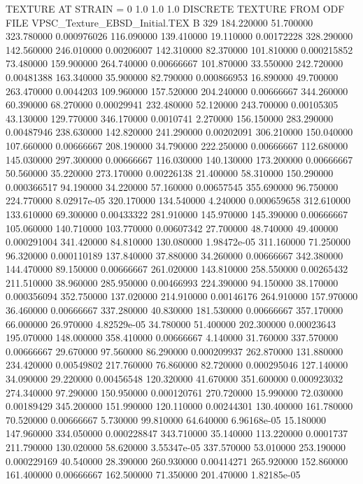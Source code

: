 TEXTURE AT STRAIN = 0
1.0   1.0   1.0
DISCRETE TEXTURE FROM ODF FILE VPSC_Texture\RD_EBSD_Initial.TEX
B 329
184.220000	51.700000	323.780000	0.000976026
116.090000	139.410000	19.110000	0.00172228
328.290000	142.560000	246.010000	0.00206007
142.310000	82.370000	101.810000	0.000215852
73.480000	159.900000	264.740000	0.00666667
101.870000	33.550000	242.720000	0.00481388
163.340000	35.900000	82.790000	0.000866953
16.890000	49.700000	263.470000	0.0044203
109.960000	157.520000	204.240000	0.00666667
344.260000	60.390000	68.270000	0.00029941
232.480000	52.120000	243.700000	0.00105305
43.130000	129.770000	346.170000	0.0010741
2.270000	156.150000	283.290000	0.00487946
238.630000	142.820000	241.290000	0.00202091
306.210000	150.040000	107.660000	0.00666667
208.190000	34.790000	222.250000	0.00666667
112.680000	145.030000	297.300000	0.00666667
116.030000	140.130000	173.200000	0.00666667
50.560000	35.220000	273.170000	0.00226138
21.400000	58.310000	150.290000	0.000366517
94.190000	34.220000	57.160000	0.00657545
355.690000	96.750000	224.770000	8.02917e-05
320.170000	134.540000	4.240000	0.000659658
312.610000	133.610000	69.300000	0.00433322
281.910000	145.970000	145.390000	0.00666667
105.060000	140.710000	103.770000	0.00607342
27.700000	48.740000	49.400000	0.000291004
341.420000	84.810000	130.080000	1.98472e-05
311.160000	71.250000	96.320000	0.000110189
137.840000	37.880000	34.260000	0.00666667
342.380000	144.470000	89.150000	0.00666667
261.020000	143.810000	258.550000	0.00265432
211.510000	38.960000	285.950000	0.00466993
224.390000	94.150000	38.170000	0.000356094
352.750000	137.020000	214.910000	0.00146176
264.910000	157.970000	36.460000	0.00666667
337.280000	40.830000	181.530000	0.00666667
357.170000	66.000000	26.970000	4.82529e-05
34.780000	51.400000	202.300000	0.00023643
195.070000	148.000000	358.410000	0.00666667
4.140000	31.760000	337.570000	0.00666667
29.670000	97.560000	86.290000	0.000209937
262.870000	131.880000	234.420000	0.00549802
217.760000	76.860000	82.720000	0.000295046
127.140000	34.090000	29.220000	0.00456548
120.320000	41.670000	351.600000	0.000923032
274.340000	97.290000	150.950000	0.000120761
270.720000	15.990000	72.030000	0.00189429
345.200000	151.990000	120.110000	0.00244301
130.400000	161.780000	70.520000	0.00666667
5.730000	99.810000	64.640000	6.96168e-05
15.180000	147.960000	334.050000	0.000228847
343.710000	35.140000	113.220000	0.0001737
211.790000	130.020000	58.620000	3.55347e-05
337.570000	53.010000	253.190000	0.000229169
40.540000	28.390000	260.930000	0.00414271
265.920000	152.860000	161.400000	0.00666667
162.500000	71.350000	201.470000	1.82185e-05
